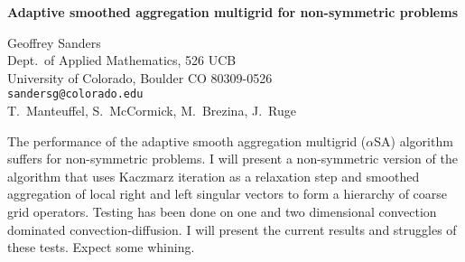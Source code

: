 \documentclass{report}
\begin{document}

\begin{center}
{\large
{\bf Adaptive smoothed aggregation multigrid for non-symmetric problems}}

	Geoffrey Sanders \\
	Dept.~of Applied Mathematics, 526 UCB \\
	University of Colorado, Boulder CO 80309-0526 \\
	{\tt sandersg@colorado.edu} \\
	T.~Manteuffel, S.~McCormick, M.~Brezina, J.~Ruge
\end{center}
The performance of the adaptive smooth aggregation multigrid
($\alpha$SA) algorithm suffers for non-symmetric problems. I
will present a non-symmetric version of the algorithm that
uses Kaczmarz iteration as a relaxation step and smoothed
aggregation of local right and left singular vectors to form
a hierarchy of coarse grid operators. Testing has been done
on one and two dimensional convection dominated
convection-diffusion. I will present the current results and
struggles of these tests. Expect some whining.



\end{document}
